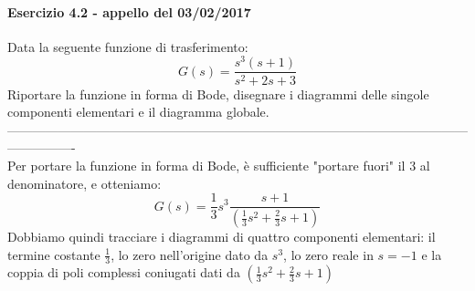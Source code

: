 \documentclass[12pt,a4paper]{article}
\begin{document}
	\paragraph*{Esercizio 4.2 - appello del 03/02/2017} Data la seguente funzione di trasferimento:
	\[
		G(s) = \frac{s^3(s+1)}{s^2+2s+3}
	\]
	Riportare la funzione in forma di Bode, disegnare i diagrammi delle singole componenti elementari e il diagramma globale.\\
	----------------------------------------------------------------------------------------------------------------------------\\Per portare la funzione in forma di Bode, \`e sufficiente "portare fuori" il 3 al denominatore, e otteniamo:
	\[
		G(s) = \frac{1}{3}s^3\frac{s+1}{\left(\frac{1}{3}s^2+\frac{2}{3}s+1\right)}
	\]
	Dobbiamo quindi tracciare i diagrammi di quattro componenti elementari: il termine costante $\frac{1}{3}$, lo zero nell'origine dato da $s^3$, lo zero reale in $s = -1$ e la coppia di poli complessi coniugati dati da $\left(\frac{1}{3}s^2+\frac{2}{3}s+1\right)$\\
\end{document}
